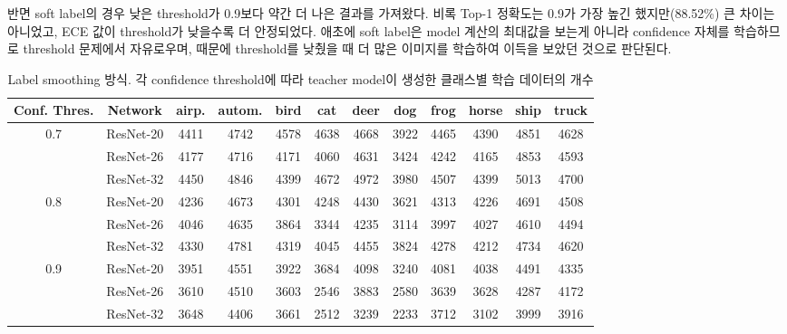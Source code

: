 반면 soft label의 경우 낮은 threshold가 0.9보다 약간 더 나은 결과를 가져왔다. 비록 Top-1 정확도는 0.9가 가장 높긴 했지만(88.52\%) 큰 차이는 아니었고, ECE 값이 threshold가 낮을수록 더 안정되었다. 애초에 soft label은 model 계산의 최대값을 보는게 아니라 confidence 자체를 학습하므로 threshold 문제에서 자유로우며, 때문에 threshold를 낮췄을 때 더 많은 이미지를 학습하여 이득을 보았던 것으로 판단된다.

\begin{table}[!h]
  \center
  \begin{tabular}{|c|c|cccccccccc|}
\hline
Conf. Thres. & Network & airp. & autom. & bird & cat & deer & dog & frog & horse & ship & truck \\ \hline
0.7 & ResNet-20 & 4411 & 4742 & 4578 & 4638 & 4668 & 3922 & 4465 & 4390 & 4851 & 4628 \\
    & ResNet-26 & 4177 & 4716 & 4171 & 4060 & 4631 & 3424 & 4242 & 4165 & 4853 & 4593 \\
    & ResNet-32 & 4450 & 4846 & 4399 & 4672 & 4972 & 3980 & 4507 & 4399 & 5013 & 4700 \\ \hline

0.8 & ResNet-20 & 4236 & 4673 & 4301 & 4248 & 4430 & 3621 & 4313 & 4226 & 4691 & 4508 \\ 
    & ResNet-26 & 4046 & 4635 & 3864 & 3344 & 4235 & 3114 & 3997 & 4027 & 4610 & 4494 \\
    & ResNet-32 & 4330 & 4781 & 4319 & 4045 & 4455 & 3824 & 4278 & 4212 & 4734 & 4620 \\ \hline

0.9 & ResNet-20 & 3951 & 4551 & 3922 & 3684 & 4098 & 3240 & 4081 & 4038 & 4491 & 4335 \\ 
    & ResNet-26 & 3610 & 4510 & 3603 & 2546 & 3883 & 2580 & 3639 & 3628 & 4287 & 4172 \\
    & ResNet-32 & 3648 & 4406 & 3661 & 2512 & 3239 & 2233 & 3712 & 3102 & 3999 & 3916 \\ \hline
  \end{tabular}
  \caption{Label smoothing 방식. 각 confidence threshold에 따라 teacher model이 생성한 클래스별 학습 데이터의 개수}
  \label{datagen_smooth_confidence}
\end{table}
